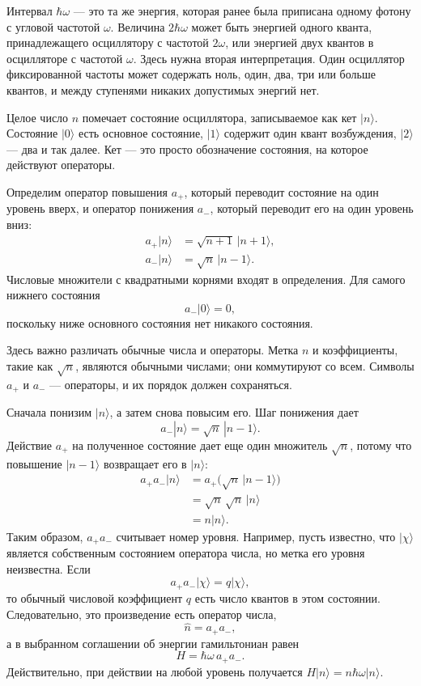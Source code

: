 Интервал \(\hbar\omega\) — это та же энергия, которая ранее была приписана одному фотону с угловой частотой \(\omega\). Величина \(2\hbar\omega\) может быть энергией одного кванта, принадлежащего осциллятору с частотой \(2\omega\), или энергией двух квантов в осцилляторе с частотой \(\omega\). Здесь нужна вторая интерпретация. Один осциллятор фиксированной частоты может содержать ноль, один, два, три или больше квантов, и между ступенями никаких допустимых энергий нет.

Целое число \(n\) помечает состояние осциллятора, записываемое как кет \(|n\rangle\). Состояние \(|0\rangle\) есть основное состояние, \(|1\rangle\) содержит один квант возбуждения, \(|2\rangle\) — два и так далее. Кет — это просто обозначение состояния, на которое действуют операторы.

Определим оператор повышения \(a_+\), который переводит состояние на один уровень вверх, и оператор понижения \(a_-\), который переводит его на один уровень вниз:
\begin{align}
a_+|n\rangle &= \sqrt{n+1}\,|n+1\rangle,\\
a_-|n\rangle &= \sqrt{n}\,|n-1\rangle.
\end{align}
Числовые множители с квадратными корнями входят в определения. Для самого нижнего состояния
\begin{equation}
a_-|0\rangle=0,
\end{equation}
поскольку ниже основного состояния нет никакого состояния.

Здесь важно различать обычные числа и операторы. Метка \(n\) и коэффициенты, такие как \(\sqrt n\), являются обычными числами; они коммутируют со всем. Символы \(a_+\) и \(a_-\) — операторы, и их порядок должен сохраняться.

Сначала понизим \(|n\rangle\), а затем снова повысим его. Шаг понижения дает
\begin{equation}
a_-|n\rangle=\sqrt n\,|n-1\rangle.
\end{equation}
Действие \(a_+\) на полученное состояние дает еще один множитель \(\sqrt n\), потому что повышение \(|n-1\rangle\) возвращает его в \(|n\rangle\):
\begin{align}
a_+a_-|n\rangle
&=a_+\bigl(\sqrt n\,|n-1\rangle\bigr)\\
&=\sqrt n\,\sqrt n\,|n\rangle\\
&=n|n\rangle.
\end{align}
Таким образом, \(a_+a_-\) считывает номер уровня. Например, пусть известно, что \(|\chi\rangle\) является собственным состоянием оператора числа, но метка его уровня неизвестна. Если
\begin{equation}
a_+a_-|\chi\rangle=q|\chi\rangle,
\end{equation}
то обычный числовой коэффициент \(q\) есть число квантов в этом состоянии. Следовательно, это произведение есть оператор числа,
\begin{equation}
\hat n=a_+a_-,
\end{equation}
а в выбранном соглашении об энергии гамильтониан равен
\begin{equation}
H=\hbar\omega\,a_+a_-.
\end{equation}
Действительно, при действии на любой уровень получается \(H|n\rangle=n\hbar\omega|n\rangle\).

